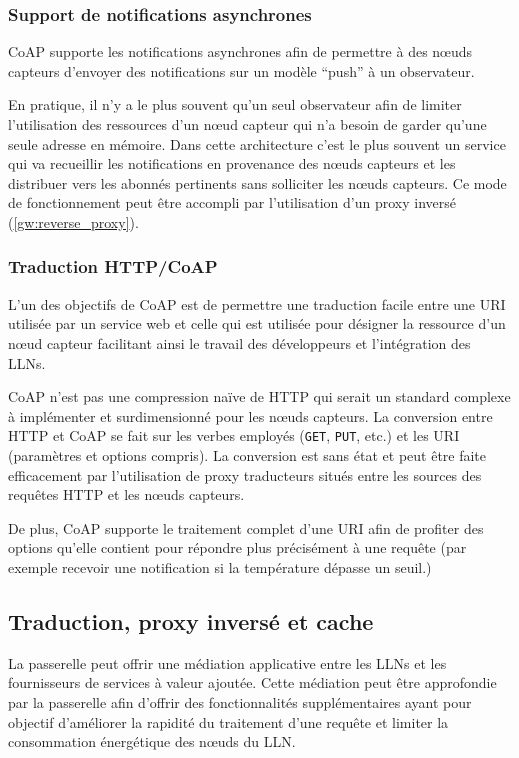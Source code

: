 \subsubsection{Support de notifications asynchrones}

\ac{CoAP} supporte les notifications asynchrones afin de permettre à des nœuds capteurs d'envoyer des notifications sur un modèle ``push'' à un observateur.

En pratique, il n'y a le plus souvent qu'un seul observateur afin de limiter l'utilisation des ressources d'un nœud capteur qui n'a besoin de garder qu'une seule adresse en mémoire.
Dans cette architecture c'est le plus souvent un service qui va recueillir les notifications en provenance des nœuds capteurs et les distribuer vers les abonnés pertinents sans solliciter les nœuds capteurs.
Ce mode de fonctionnement peut être accompli par l'utilisation d'un proxy inversé (\ref{gw:reverse_proxy}).

\subsubsection{Traduction \ac{HTTP}/\ac{CoAP}}

L'un des objectifs de \ac{CoAP} est de permettre une traduction facile entre une \ac{URI} utilisée par un service web et celle qui est utilisée pour désigner la ressource d'un nœud capteur facilitant ainsi le travail des développeurs et l'intégration des \ac{LLN}s.

\ac{CoAP} n'est pas une compression naïve de \ac{HTTP} qui serait un standard complexe à implémenter et surdimensionné pour les nœuds capteurs.
La conversion entre \ac{HTTP} et \ac{CoAP} se fait sur les verbes employés (\texttt{GET}, \texttt{PUT}, etc.) et les \ac{URI} (paramètres et options compris).
La conversion est sans état et peut être faite efficacement par l'utilisation de proxy traducteurs situés entre les sources des requêtes \ac{HTTP} et les nœuds capteurs.

De plus, \ac{CoAP} supporte le traitement complet d'une \ac{URI} afin de profiter des options qu'elle contient pour répondre plus précisément à une requête (par exemple recevoir une notification si la température dépasse un seuil.)

\subsection{Traduction, proxy inversé et cache}
\label{gw:rpc}

La passerelle peut offrir une médiation applicative entre les \ac{LLN}s et les fournisseurs de services à valeur ajoutée.
Cette médiation peut être approfondie par la passerelle afin d'offrir des fonctionnalités supplémentaires ayant pour objectif d'améliorer la rapidité du traitement d'une requête et limiter la consommation énergétique des nœuds du \ac{LLN}.


